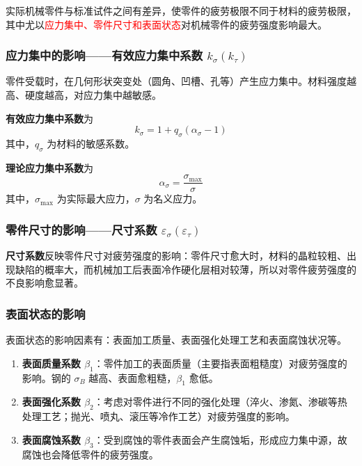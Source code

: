 实际机械零件与标准试件之间有差异，使零件的疲劳极限不同于材料的疲劳极限，其中尤以\textcolor{red}{应力集中、零件尺寸和表面状态}对机械零件的疲劳强度影响最大。

\subsubsection{应力集中的影响——有效应力集中系数 $k_\sigma(k_\tau)$}

零件受载时，在几何形状突变处（圆角、凹槽、孔等）产生应力集中。材料强度越高、硬度越高，对应力集中越敏感。

\begin{definition}
\label{def:有效应力集中系数}
\textbf{有效应力集中系数}为
\begin{equation}
	k_\sigma=1+q_\sigma(\alpha_\sigma-1)
	\label{eq:强度:有效应力集中系数}
\end{equation}
其中，$q_\sigma$ 为材料的敏感系数。
\end{definition}

\begin{definition}[理论应力集中系数]
\label{def:理论应力集中系数}
\textbf{理论应力集中系数}为
\begin{equation}
	\alpha_\sigma=\frac{\sigma_{\max}}{\sigma}
	\label{eq:强度:理论应力集中系数}
\end{equation}
其中，$\sigma_{\max}$ 为实际最大应力，$\sigma$ 为名义应力。
\end{definition}

\subsubsection{零件尺寸的影响——尺寸系数 $\varepsilon_\sigma(\varepsilon_\tau)$}

\begin{definition}
\label{def:尺寸系数}
\textbf{尺寸系数}反映零件尺寸对疲劳强度的影响：零件尺寸愈大时，材料的晶粒较粗、出现缺陷的概率大，而机械加工后表面冷作硬化层相对较薄，所以对零件疲劳强度的不良影响愈显著。
\end{definition}

\subsubsection{表面状态的影响}

\begin{definition}[表面状态的影响因素]
\label{def:表面状态}
表面状态的影响因素有：表面加工质量、表面强化处理工艺和表面腐蚀状况等。
\begin{enumerate}
	\item \textbf{表面质量系数 $\beta_1$}：零件加工的表面质量（主要指表面粗糙度）对疲劳强度的影响。钢的 $\sigma_B$ 越高、表面愈粗糙，$\beta_1$ 愈低。
	\item \textbf{表面强化系数 $\beta_2$}：考虑对零件进行不同的强化处理（淬火、渗氮、渗碳等热处理工艺；抛光、喷丸、滚压等冷作工艺）对疲劳强度的影响。
	\item \textbf{表面腐蚀系数 $\beta_3$}：受到腐蚀的零件表面会产生腐蚀垢，形成应力集中源，故腐蚀也会降低零件的疲劳强度。
\end{enumerate}
\end{definition}

